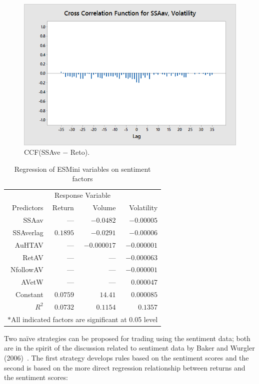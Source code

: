 	\begin{figure}[!ht]
	\centering
	\includegraphics[width=\textwidth]{chapters/chapter_news_an/figures/ch4sec4ssaavvola} 
	\caption{CCF(SSAve $-$ Reto). \label{fig:ccfssavvol}}
	\end{figure}

	\begin{table}[!ht]
	\centering
	\caption{Regression of ESMini variables on sentiment factors \label{tab:regesmini}}
	\begin{tabular}{rrrr}
	\multicolumn{4}{c}{Response Variable} \\
	Predictors & Return & Volume & Volatility \\ \hline
	SSAav & --- & $-0.0482$ & $-0.00005$ \\
	SSAverlag & $0.1895$ & $-0.0291$ & $-0.00006$ \\
	AuHTAV & --- & $-0.000017$ & $-0.000001$ \\
	RetAV & --- & --- & $-0.000063$ \\
	NfollowAV & --- & --- & $-0.000001$ \\
	AVetW & --- & --- & $0.000047$ \\
	Constant & $0.0759$ & $14.41$ & $0.000085$ \\ \hline
	$R^2$ & $0.0732$ & $0.1154$ & $0.1357$ \\ \hline
	\multicolumn{4}{c}{$\ast$All indicated factors are significant at 0.05 level}
	\end{tabular} 
	\end{table}

Two na\"ive strategies can be proposed for trading using the sentiment data; both are in the spirit of the discussion related to sentiment data by Baker and Wurgler (2006)~\cite{baker2006investor}. The first strategy develops rules based on the sentiment scores and the second is based on the more direct regression relationship between returns and the sentiment scores: 

